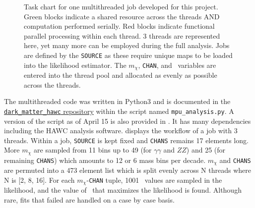 \begin{figure}[h]
    \caption{Task chart for one multithreaded job developed for this project. Green blocks indicate a shared resource across the threads AND computation performed serially. Red blocks indicate functional parallel processing within each thread. 3 threads are represented here, yet many more can be employed during the full analysis. Jobs are defined by the \texttt{SOURCE} as these require unique maps to be loaded into the likelihood estimator. The $m_\chi$, \texttt{CHAN}, and \sv~variables are entered into the thread pool and allocated as evenly as possible across the threads.}
    \label{fig:mtd_multithreads}
\end{figure}

The multithreaded code was written in Python3 and is documented in the \href{https://gitlab.com/hawc-observatory/sandboxes/salaza82/dark\_matter\_hawc}{\texttt{dark\_matter\_hawc} repository} within the script named \texttt{mpu\_analysis.py}.
A version of the script as of April 15 is also provided in .
It has many dependencies including the HAWC analysis software.
 displays the workflow of a job with 3 threads.
Within a job, \texttt{SOURCE} is kept fixed and \texttt{CHANS} remains 17 elements long.
More $m_\chi$ are sampled from 11 bins up to 49 (for $\gamma\gamma$ and $ZZ$) and 25 (for remaining \texttt{CHANS}) which amounts to 12 or 6 mass bins per decade.
$m_\chi$ and \texttt{CHANS} are permuted into a 473 element list which is split evenly across N threads where N is [2, 8, 16].
For each $m_\chi$-\texttt{CHAN} tuple, 1001 \sv~values are sampled in the likelihood, and the value of \sv~that maximizes the likelihood is found.
Although rare, fits that failed are handled on a case by case basis.

